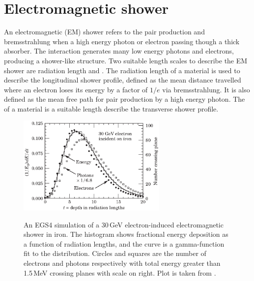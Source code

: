 
\section{Electromagnetic shower}
\label{sec:photonEMshower}
An electromagnetic (EM) shower refers to the pair production and bremsstrahlung when a high energy photon or electron passing though a thick absorber. The interaction generates many low energy photons and electrons, producing a shower-like  structure. Two suitable length scales to describe the EM shower are radiation length and \RM. The radiation length of a material is used to describe the longitudinal shower profile, defined as the mean distance travelled where an electron loses its energy by a factor of $1/e$ via bremsstrahlung. It is also defined as the mean free path  for pair production by a high energy photon\cite{segre1977nuclei}. The \RM of a material is a suitable length describe the transverse shower profile.

\begin{figure}[tbph]
\centering
{\includegraphics[width=0.65\textwidth]{photon/EMlong}}
\caption[Simulated longitudinal electromagnetic shower profile as a function of depth for electrons and photons.]
{An EGS4 simulation of a 30\,GeV electron-induced electromagnetic shower in iron. The histogram shows fractional energy deposition as a function of radiation lengths, and the curve is a gamma-function fit to the distribution. Circles and squares are the number of electrons and photons respectively with total energy greater than 1.5\,MeV crossing planes with scale on right. Plot is taken from \cite{Agashe:2014kda}.}
\label{fig:photonEMlongProfile}
\end{figure}

